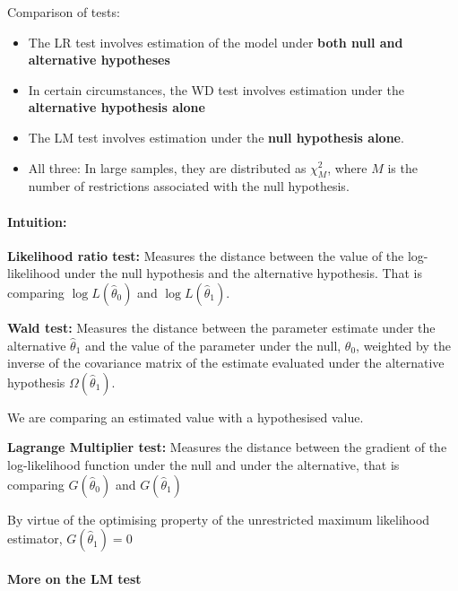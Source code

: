 \documentclass[11pt]{article}
\begin{document}
\begin{definition}
    Comparison of tests:
    \begin{itemize}
        \item The LR test involves estimation of the model under \textbf{both null and alternative hypotheses}
        \item In certain circumstances, the WD test involves estimation under the \textbf{alternative hypothesis alone}
        \item The LM test involves estimation under the \textbf{null hypothesis alone}.
        \item All three:
        In large samples, they are distributed as $\chi^2_M$, where $M$ is the number of restrictions associated with the null hypothesis.
    \end{itemize}
\end{definition}

\begin{shaded}
    \paragraph{Intuition:} \mbox{}

    \textbf{Likelihood ratio test:} Measures the distance between the value of the log-likelihood under the null hypothesis and the alternative hypothesis. That is comparing $\log L(\hat{\theta}_0)$ and $\log L(\hat{\theta}_1)$.

    \textbf{Wald test:} Measures the distance between the parameter estimate under the alternative $\hat{\theta}_1$ and the value of the parameter under the null, $\theta_0$, weighted by the inverse of the covariance matrix of the estimate evaluated under the alternative hypothesis $\Omega(\hat{\theta}_1)$.
    \begin{note}
        We are comparing an estimated value with a hypothesised value.
    \end{note}

    \textbf{Lagrange Multiplier test:} Measures the distance between the gradient of the log-likelihood function under the null and under the alternative, that is comparing $G(\hat{\theta}_0)$ and $G(\hat{\theta}_1)$
    \begin{note}
        By virtue of the optimising property of the unrestricted maximum likelihood estimator, $G(\hat{\theta}_1) = 0$
    \end{note}
\end{shaded}

\paragraph{More on the LM test}\mbox{}
\end{document}
